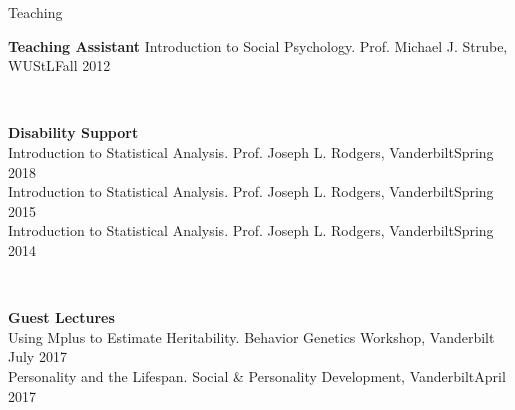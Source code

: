 \begin{rSection}{\textrm{Teaching}}
\begin{minipage}{\linewidth}{\large {\bf Teaching Assistant}}
Introduction to Social Psychology. Prof. Michael J. Strube, WUStL\hfill{Fall 2012}\end{minipage}\medskip\\
\begin{minipage}{\linewidth}{\large {\bf Disability Support}}\\
Introduction to Statistical Analysis. Prof. Joseph L. Rodgers, Vanderbilt\hfill  {Spring 2018}\smallskip\\
Introduction to Statistical Analysis. Prof. Joseph L. Rodgers, Vanderbilt\hfill  {Spring 2015}\smallskip\\
Introduction to Statistical Analysis. Prof. Joseph L. Rodgers, Vanderbilt\hfill{Spring 2014}\end{minipage}\medskip\\
\begin{minipage}{\linewidth}{\large {\bf Guest Lectures}}\\
Using Mplus to Estimate Heritability. Behavior Genetics Workshop, Vanderbilt \hfill{July 2017}\\
Personality and the Lifespan. Social \& Personality Development, Vanderbilt\hfill {April 2017}\end{minipage}
\end{rSection}
